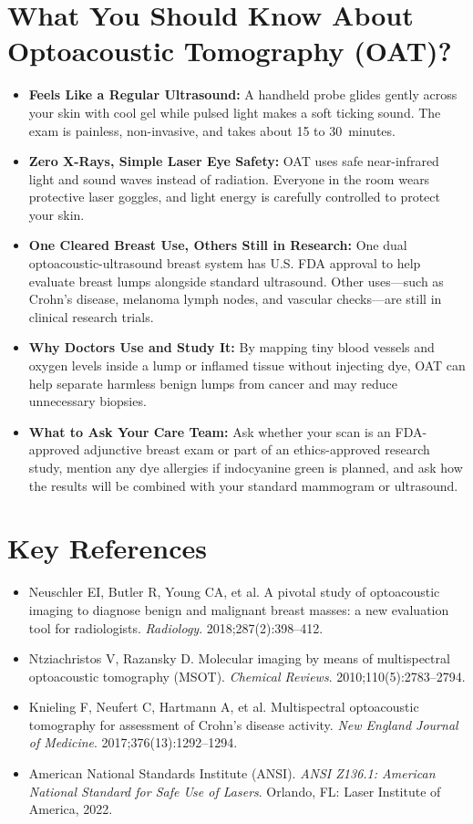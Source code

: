 \section{What You Should Know About Optoacoustic Tomography (OAT)?}
\begin{itemize}
  \item \textbf{Feels Like a Regular Ultrasound:} A handheld probe glides gently across your skin with cool gel while pulsed light makes a soft ticking sound. The exam is painless, non-invasive, and takes about 15 to 30~minutes.
  \item \textbf{Zero X-Rays, Simple Laser Eye Safety:} OAT uses safe near-infrared light and sound waves instead of radiation. Everyone in the room wears protective laser goggles, and light energy is carefully controlled to protect your skin.
  \item \textbf{One Cleared Breast Use, Others Still in Research:} One dual optoacoustic-ultrasound breast system has U.S. FDA approval to help evaluate breast lumps alongside standard ultrasound. Other uses---such as Crohn's disease, melanoma lymph nodes, and vascular checks---are still in clinical research trials.
  \item \textbf{Why Doctors Use and Study It:} By mapping tiny blood vessels and oxygen levels inside a lump or inflamed tissue without injecting dye, OAT can help separate harmless benign lumps from cancer and may reduce unnecessary biopsies.
  \item \textbf{What to Ask Your Care Team:} Ask whether your scan is an FDA-approved adjunctive breast exam or part of an ethics-approved research study, mention any dye allergies if indocyanine green is planned, and ask how the results will be combined with your standard mammogram or ultrasound.
\end{itemize}

\section{Key References}
\begin{itemize}
  \item Neuschler EI, Butler R, Young CA, et al. A pivotal study of optoacoustic imaging to diagnose benign and malignant breast masses: a new evaluation tool for radiologists. \emph{Radiology}. 2018;287(2):398--412.
  \item Ntziachristos V, Razansky D. Molecular imaging by means of multispectral optoacoustic tomography (MSOT). \emph{Chemical Reviews}. 2010;110(5):2783--2794.
  \item Knieling F, Neufert C, Hartmann A, et al. Multispectral optoacoustic tomography for assessment of Crohn's disease activity. \emph{New England Journal of Medicine}. 2017;376(13):1292--1294.
  \item American National Standards Institute (ANSI). \emph{ANSI Z136.1: American National Standard for Safe Use of Lasers}. Orlando, FL: Laser Institute of America, 2022.
\end{itemize}
